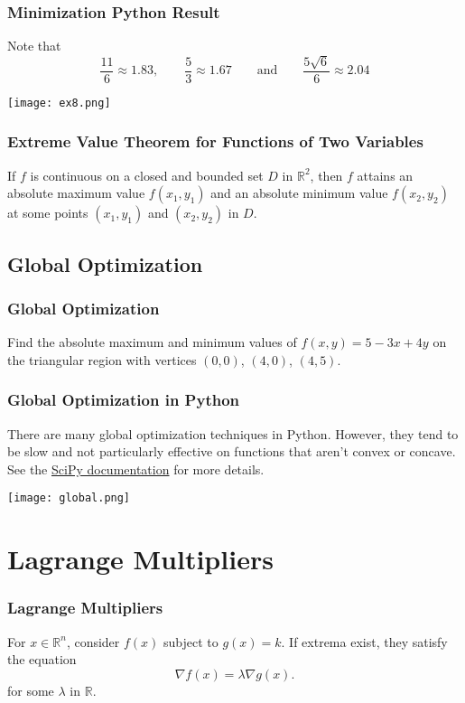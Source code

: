 \documentclass{beamer}
\begin{document}
\begin{frame}
\frametitle{Minimization Python Result}
Note that
$$
\frac{11}{6} \approx 1.83,\qquad \frac{5}{3} \approx 1.67\qquad\text{and}\qquad \frac{5\sqrt{6}}{6}\approx 2.04
$$
\begin{center}
\texttt{[image: ex8.png]}
\end{center}
\end{frame}

\begin{frame}
\frametitle{Extreme Value Theorem for Functions of Two Variables}
\begin{Theorem}
If $f$ is continuous on a closed and bounded set $D$ in $\mathbb{R}^2$, then $f$ attains an absolute maximum value $f(x_1, y_1)$ and an absolute minimum value $f(x_2, y_2)$ at some points $(x_1, y_1)$ and $(x_2, y_2)$ in $D$.
\end{Theorem}
\end{frame}

\subsection{Global Optimization}

\begin{frame}[t]
\frametitle{Global Optimization}
\begin{Example}
Find the absolute maximum and minimum values of $f(x, y) = 5 - 3x + 4y$ on the triangular region with vertices $(0, 0)$, $(4, 0)$, $(4, 5)$.
\end{Example}
\end{frame}

\begin{frame}
\frametitle{Global Optimization in Python}
\tiny
There are many global optimization techniques in Python. However, they tend to be slow and not particularly effective on functions that aren't convex or concave. See the \href{https://docs.scipy.org/doc/scipy/reference/optimize.html}{SciPy documentation} for more details. 
\begin{center}
\texttt{[image: global.png]}
\end{center}
\end{frame}

\section{Lagrange Multipliers}

\begin{frame}
\frametitle{Lagrange Multipliers}
For $x\in \mathbb{R}^n$, consider $f(x)$ subject to $g(x) = k$. If extrema exist, they satisfy the equation
$$
\nabla f(x) = \lambda \nabla g(x).
$$
for some $\lambda$ in $\mathbb{R}$.
\end{frame}
\end{document}
